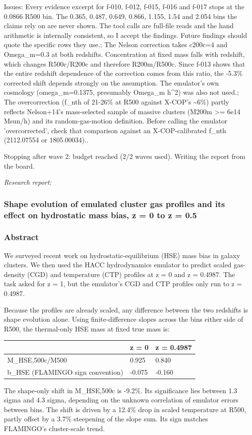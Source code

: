 \documentclass[11pt,a4paper]{article}
\begin{document}
Issues: Every evidence excerpt for f-010, f-012, f-015, f-016 and f-017 stops at the 0.0866 R500 bin. The 0.365, 0.487, 0.649, 0.866, 1.155, 1.54 and 2.054 bins the claims rely on are never shown. The tool calls are full-file reads and the hand arithmetic is internally consistent, so I accept the findings. Future findings should quote the specific rows they use.; The Nelson correction takes c200c=4 and Omega\_m=0.3 at both redshifts. Concentration at fixed mass falls with redshift, which changes R500c/R200c and therefore R200m/R500c. Since f-013 shows that the entire redshift dependence of the correction comes from this ratio, the -5.3\% corrected shift depends strongly on the assumption. The emulator's own cosmology (omega\_m=0.1375, presumably Omega\_m h\textasciicircum{}2) was also not used.; The overcorrection (f\_nth of 21-26\% at R500 against X-COP's \textasciitilde{}6\%) partly reflects Nelson+14's mass-selected sample of massive clusters (M200m \textgreater{}= 6e14 Msun/h) and its random-gas-motion definition. Before calling the emulator 'overcorrected', check that comparison against an X-COP-calibrated f\_nth (2112.07554 or 1805.00034)..

Stopping after wave 2: budget reached (2/2 waves used). Writing the report from the board.

\textit{Research report:}\par
\subsubsection*{Shape evolution of emulated cluster gas profiles and its effect on hydrostatic mass bias, z = 0 to z = 0.5}
\subsubsection*{Abstract}
We surveyed recent work on hydrostatic-equilibrium (HSE) mass bias in galaxy clusters. We then used the HACC hydrodynamics emulator to predict scaled gas-density (CGD) and temperature (CTP) profiles at z = 0 and z = 0.4987. The task asked for z = 1, but the emulator's CGD and CTP profiles only run to z = 0.4987.

Because the profiles are already scaled, any difference between the two redshifts is shape evolution alone. Using finite-difference slopes across the bins either side of R500, the thermal-only HSE mass at fixed true mass is:

\begin{longtable}{@{}p{}p{}p{}@{}}
\toprule
\textbf{} & \textbf{z = 0} & \textbf{z = 0.4987} \\ \midrule \endhead
M\_HSE,500c/M500 & 0.925 & 0.840 \\
b\_HSE (FLAMINGO sign convention) & -0.075 & -0.160 \\
\bottomrule\end{longtable}
The shape-only shift in M\_HSE,500c is -9.2\%. Its significance lies between 1.3 sigma and 4.3 sigma, depending on the unknown correlation of emulator errors between bins. The shift is driven by a 12.4\% drop in scaled temperature at R500, partly offset by a 3.7\% steepening of the slope sum. Its sign matches FLAMINGO's cluster-scale trend.
\end{document}
